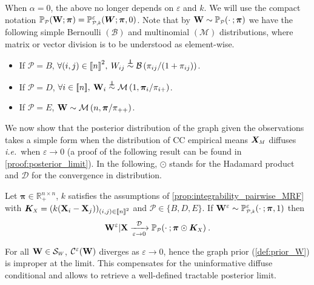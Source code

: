 When $\alpha = 0$, the above no longer depends on $\varepsilon$ and $k$. We will use the compact notation $\mathbb{P}_{\scaleto{\mathcal{P}}{4pt}}(\Wb ; \bm{\pi}) = \mathbb{P}_{\scaleto{\mathcal{P},k}{5pt}}^{\varepsilon}(\bm{W}; \bm{\pi}, 0)$. Note that by $\Wb \sim \mathbb{P}_{\scaleto{\mathcal{P}}{4pt}}(\cdot \: ; \bm{\pi})$ we have the following simple Bernoulli $(\mathcal{B})$ and multinomial $(\mathcal{M})$ distributions, where matrix or vector division is to be understood as element-wise.
\begin{itemize}
    \item If $\mathcal{P} = B$, $\forall (i,j) \in {[\![n]\!]}^2, \: W_{ij} \stackrel{\perp\!\!\!\!\perp}{\sim} \mathcal{B}\left(\pi_{ij}/(1 + \pi_{ij}) \right)$.
    \item If $\mathcal{P} = D$, $\forall i \in {[\![n]\!]}, \: \mathbf{W}_{i} \stackrel{\perp\!\!\!\!\perp}{\sim} \mathcal{M}\left(1, \bm{\pi}_{i}/\pi_{i+} \right)$.
    \item If $\mathcal{P} = E$, $\mathbf{W} \sim \mathcal{M}\left(n, \bm{\pi}/\pi_{++} \right)$.
\end{itemize}

We now show that the posterior distribution of the graph given the observations takes a simple form when the distribution of CC empirical means $\bm{X}_{\scaleto{M}{4pt}}$ diffuses \textit{i.e.}\ when $\varepsilon \to 0$ (a proof of the following result can be found in \cref{proof:posterior_limit}). In the following, $\odot$ stands for the Hadamard product and $\mathcal{D}$ for the convergence in distribution.

\begin{proposition}\label{prop:posterior_W}
Let $\bm{\pi} \in \mathbb{R}_+^{n \times n}$, $k$ satisfies the assumptions of \cref{prop:integrability_pairwise_MRF} with  $\bm{K}_{\scaleto{X}{4pt}} = (k(\Xb_{i} - \Xb_{j}))_{(i,j) \in \integ{n}^2}$ and $\mathcal{P}\in \{B, D, E\}$. If $\Wb^{\varepsilon} \sim \mathbb{P}_{\scaleto{\mathcal{P},k}{5pt}}^{\varepsilon}(\cdot \: ; \bm{\pi},1)$ then
$$\Wb^{\varepsilon} | \Xb \xrightarrow[\varepsilon \to 0]{\mathcal{D}} \mathbb{P}_{\scaleto{\mathcal{P}}{4pt}}(\cdot \: ;\bm{\pi} \odot \bm{K}_{\scaleto{X}{4pt}}) \:.$$
\end{proposition}

\begin{remark}
For all $\Wb \in \mathcal{S}_{\scaleto{W}{4pt}}$, $\mathcal{C}^{\varepsilon}(\mathbf{W})$ diverges as $\varepsilon \to 0$, hence the graph prior (\cref{def:prior_W}) is improper at the limit. This compensates for the uninformative diffuse conditional and allows to retrieve a well-defined tractable posterior limit.
\end{remark}

